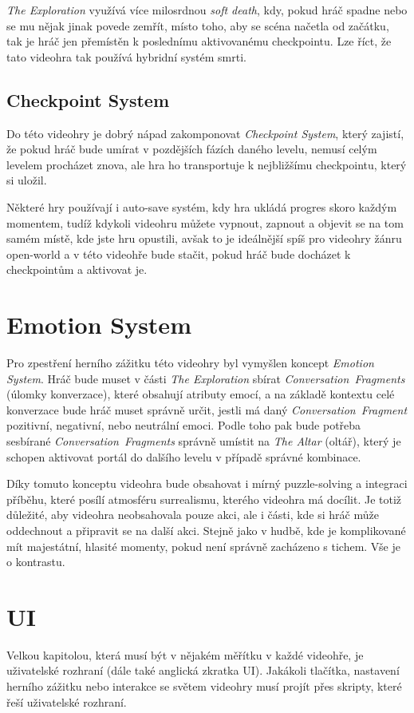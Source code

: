 \emph{The Exploration} využívá více milosrdnou \emph{soft death}, kdy, pokud hráč spadne nebo se mu nějak jinak povede zemřít, místo toho, aby se scéna načetla od začátku, tak je hráč jen přemístěn k poslednímu aktivovanému checkpointu. Lze říct, že tato videohra tak používá hybridní systém smrti.

\subsection{Checkpoint System}
Do této videohry je dobrý nápad zakomponovat \emph{Checkpoint System}, který zajistí, že pokud hráč bude umírat v pozdějších fázích daného levelu, nemusí celým levelem procházet znova, ale hra ho transportuje k nejbližšímu checkpointu, který si uložil.

Některé hry používají i auto-save systém, kdy hra ukládá progres skoro každým momentem, tudíž kdykoli videohru můžete vypnout, zapnout a objevit se na tom samém místě, kde jste hru opustili, avšak to je ideálnější spíš pro videohry žánru open-world a v této videohře bude stačit, pokud hráč bude docházet k checkpointům a aktivovat je.

\section{Emotion System}
Pro zpestření herního zážitku této videohry byl vymyšlen koncept \emph{Emotion System}. Hráč bude muset v části \emph{The Exploration} sbírat \emph{Conversation~Fragments} (úlomky konverzace), které obsahují atributy emocí, a na základě kontextu celé konverzace bude hráč muset správně určit, jestli má daný \emph{Conversation~Fragment} pozitivní, negativní, nebo neutrální emoci. Podle toho pak bude potřeba sesbírané \emph{Conversation~Fragments} správně umístit na \emph{The Altar} (oltář), který je schopen aktivovat portál do dalšího levelu v případě správné kombinace.

Díky tomuto konceptu videohra bude obsahovat i mírný puzzle-solving a integraci příběhu, které posílí atmosféru surrealismu, kterého videohra má docílit. Je totiž důležité, aby videohra neobsahovala pouze akci, ale i části, kde si hráč může oddechnout a připravit se na další akci. Stejně jako v hudbě, kde je komplikované mít majestátní, hlasité momenty, pokud není správně zacházeno s tichem. Vše je o kontrastu.

\section{UI}
Velkou kapitolou, která musí být v nějakém měřítku v každé videohře, je uživatelské rozhraní (dále také anglická zkratka UI). Jakákoli tlačítka, nastavení herního zážitku nebo interakce se světem videohry musí projít přes skripty, které řeší uživatelské rozhraní.

